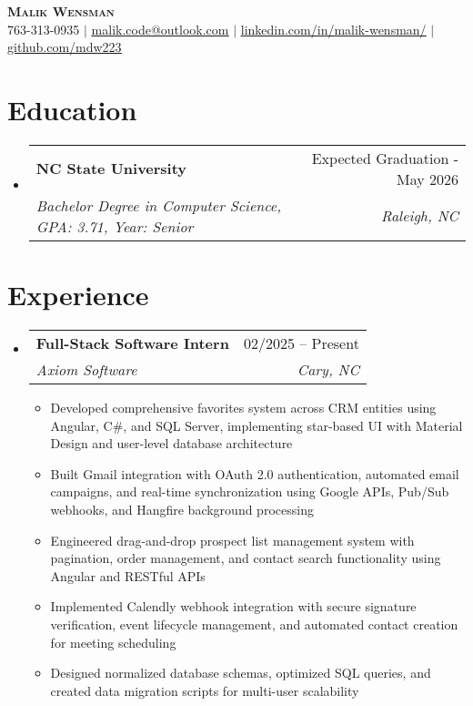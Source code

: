 \documentclass[letterpaper,11pt]{article}
\makeatletter
\newcommand{\resumeItem}[1]{
  \item\small{
    {#1 \vspace{-2pt}}
  }
}
\newcommand{\resumeSubheading}[4]{
  \vspace{-2pt}\item
    \begin{tabular*}{0.97\textwidth}[t]{l@{\extracolsep{\fill}}r}
      \textbf{#1} & #2 \\
      \textit{\small#3} & \textit{\small #4} \\
    \end{tabular*}\vspace{-7pt}
}
\newcommand{\resumeSubHeadingListStart}{\begin{itemize}[leftmargin=0.15in, label={}]}
\newcommand{\resumeSubHeadingListEnd}{\end{itemize}}
\newcommand{\resumeItemListStart}{\begin{itemize}}
\newcommand{\resumeItemListEnd}{\end{itemize}\vspace{-5pt}}
\makeatother
\begin{document}

\begin{center}
    \textbf{\Huge \scshape Malik Wensman} \\ \vspace{1pt}
    \small 763-313-0935 $|$ \href{mailto:malik.code@outlook.com}{\underline{malik.code@outlook.com}} $|$ 
    \href{https://www.linkedin.com/in/malik-wensman/}{\underline{linkedin.com/in/malik-wensman/}} $|$
    \href{https://github.com/mdw223}{\underline{github.com/mdw223}}
\end{center}


\section{Education}
  \resumeSubHeadingListStart
    \resumeSubheading
      {NC State University}{Expected Graduation - May 2026}
      {Bachelor Degree in Computer Science, GPA: 3.71, Year: Senior}{Raleigh, NC}
  \resumeSubHeadingListEnd

\section{Experience}
  \resumeSubHeadingListStart
    \resumeSubheading
      {Full-Stack Software Intern}{02/2025 – Present}
      {Axiom Software}{Cary, NC}
      \resumeItemListStart
        \resumeItem{Developed comprehensive favorites system across CRM entities using Angular, C\#, and SQL Server, implementing star-based UI with Material Design and user-level database architecture}
        \resumeItem{Built Gmail integration with OAuth 2.0 authentication, automated email campaigns, and real-time synchronization using Google APIs, Pub/Sub webhooks, and Hangfire background processing}
        \resumeItem{Engineered drag-and-drop prospect list management system with pagination, order management, and contact search functionality using Angular and RESTful APIs}
        \resumeItem{Implemented Calendly webhook integration with secure signature verification, event lifecycle management, and automated contact creation for meeting scheduling}
        \resumeItem{Designed normalized database schemas, optimized SQL queries, and created data migration scripts for multi-user scalability}
    \resumeItemListEnd
  \resumeSubHeadingListEnd
\end{document}
